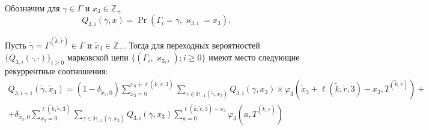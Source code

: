 \documentclass[a4paper,12pt,russian]{extarticle}
\newcommand{\MarkThree}{\{(\Gamma_i, \varkappa_{3,i}); i \geqslant 0\}}
\begin{document}
Обозначим для $\gamma \in \Gamma$ и $x_3 \in {\mathbb Z}_+$
\begin{equation}
Q_{3,i}(\gamma,x) = \Pr(\Gamma_{i}=\gamma, \varkappa_{3,i}=x_3).
\end{equation}

\begin{theorem}
Пусть $\tilde{\gamma} =\Gamma^{(\tilde{k},\tilde{r})}\in \Gamma$ и $\tilde{x}_3 \in {\mathbb Z}_+$. Тогда для переходных вероятностей $\{Q_{3,i}(\cdot,\cdot)\}_{i\geqslant 0}$ марковской цепи $\MarkThree$ имеют место следующие рекуррентные соотношения:
\begin{multline}
Q_{3,i+1}(\tilde{\gamma},\tilde{x}_3) = (1-\delta_{\tilde{x}_3,0}) \sum_{x_3=0}^{\tilde{x}_3 +  \ell(\tilde{k},\tilde{r},3)}\sum_{\gamma \in {\mathbb H}_{-1}(\tilde{\gamma},x_3)} Q_{3,i}(\gamma,x_3) \times 
\varphi_3(\tilde{x}_3 + \ell(\tilde{k},\tilde{r},3) - x_3,T^{(\tilde{k},\tilde{r})}) + \\
+ \delta_{\tilde{x}_3,0} \sum_{x_3=0}^{\ell(\tilde{k},\tilde{r},3)}\sum_{\gamma \in {\mathbb H}_{-1}(\tilde{\gamma},x_3)} Q_{3,i}(\gamma,x_3) \sum_{a=0}^{\ell(\tilde{k},\tilde{r},3) - x_3} \varphi_3(a,T^{(\tilde{k},\tilde{r})})
\label{prob:rek}
\end{multline}
\end{theorem}
\end{document}
